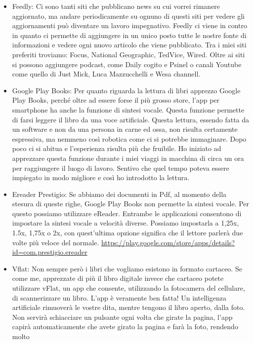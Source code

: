 \documentclass[12pt]{book} %
\begin{document}
\begin{itemize}
\item Feedly: Ci sono tanti siti che pubblicano news su cui vorrei rimanere aggiornato, ma andare periodicamente su
ognuno di questi siti per vedere gli aggiornamenti può diventare un lavoro impegnativo. Feedly ci viene in contro in
quanto ci permette di aggiungere in un unico posto tutte le nostre fonte di informazioni e vedere ogni nuovo articolo
che viene pubblicato. Tra i miei siti preferiti troviamo: Focus, National Geographic, TedVice, Wired. Oltre ai siti si
possono aggiungere podcast, come Daily cogito e Psinel o canali Youtube come quello di Just Mick, Luca Mazzucchelli e
Wesa channell.
\item Google Play Books: Per quanto riguarda la lettura di libri apprezzo Google Play Books, perché oltre ad essere
forse il più grosso store, l'app per smartphone ha anche la funzione di sintesi vocale. Questa
funzione permette di farsi leggere il libro da una voce artificiale. Questa lettura, essendo fatta da un software e non
da una persona in carne ed ossa, non risulta certamente espressiva, ma nemmeno così robotica come ci si potrebbe
immaginare. Dopo poco ci si abitua e l'esperienza risulta più che fruibile. Ho iniziato ad
apprezzare questa funzione durante i miei viaggi in macchina di circa un ora per raggiungere il luogo di lavoro.
Sentivo che quel tempo poteva essere impiegato in modo migliore e così ho introdotto la lettura.
\item Ereader Prestigio: Se abbiamo dei documenti in Pdf, al momento della stesura di queste righe, Google Play Books
non permette la sintesi vocale. Per questo possiamo utilizzare eReader. Entrambe le applicazioni consentono di
impostare la sintesi vocale a velocità diverse. Possiamo impostarla a 1,25x, 1.5x, 1,75x o 2x, con
quest'ultima opzione significa che il lettore parlerà due volte più veloce del normale.
\protect\url{https://play.google.com/store/apps/details?id=com.prestigio.ereader} 
\item Vflat: Non sempre però i libri che vogliamo esistono in formato cartaceo. Se come me, apprezzate di più il libro
digitale invece che cartaceo potete utilizzare vFlat, un app che consente, utilizzando la fotocamera del cellulare, di
scannerizzare un libro. L'app è veramente ben fatta! Un intelligenza artificiale rimuoverà le
vostre dita, mentre tengono il libro aperto, dalla foto. Non servirà schiacciare un pulsante ogni volta che girate la
pagina, l'app capirà automaticamente che avete girato la pagina e farà la foto, rendendo molto

\end{itemize}
\end{document}
